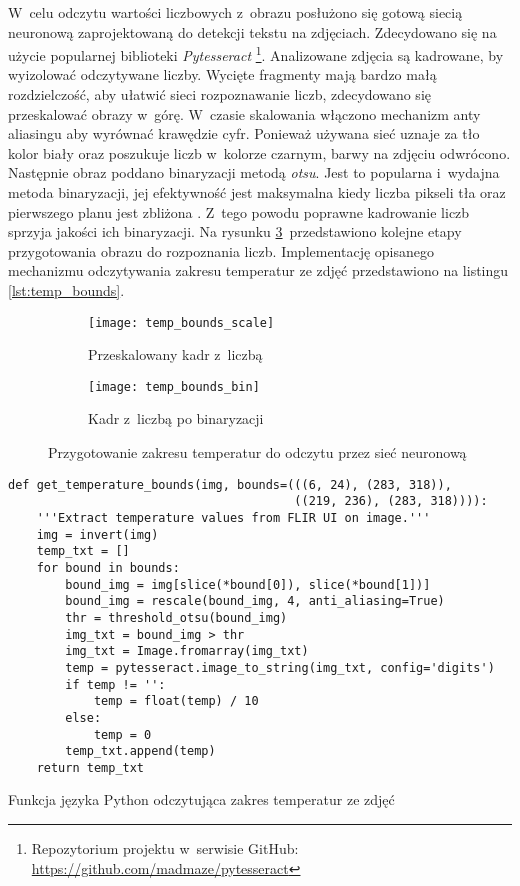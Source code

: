 W~celu odczytu wartości liczbowych z~obrazu posłużono się gotową siecią
neuronową zaprojektowaną do detekcji tekstu na zdjęciach.
Zdecydowano się na użycie popularnej biblioteki \emph{Pytesseract}%
\footnote{%
    Repozytorium projektu w~serwisie GitHub:
    \url{https://github.com/madmaze/pytesseract}
}.
Analizowane zdjęcia są kadrowane, by wyizolować odczytywane liczby.
Wycięte fragmenty mają bardzo małą rozdzielczość, aby ułatwić sieci
rozpoznawanie liczb, zdecydowano się przeskalować obrazy w~górę.
W~czasie skalowania włączono mechanizm anty aliasingu aby wyrównać krawędzie
cyfr.
Ponieważ używana sieć uznaje za tło kolor biały oraz poszukuje liczb w~kolorze
czarnym, barwy na zdjęciu odwrócono.
Następnie obraz poddano binaryzacji metodą \emph{otsu}.
Jest to popularna i~wydajna metoda binaryzacji, jej efektywność jest maksymalna
kiedy liczba pikseli tła oraz pierwszego planu jest zbliżona
\cite{sezgin_thresholding}.
Z~tego powodu poprawne kadrowanie liczb sprzyja jakości ich binaryzacji.
Na rysunku \ref{fig:temp_bounds}~przedstawiono kolejne etapy przygotowania
obrazu do rozpoznania liczb.
Implementację opisanego mechanizmu odczytywania zakresu temperatur ze zdjęć
przedstawiono na listingu \ref{lst:temp_bounds}.
\begin{figure}[htbp]
    \hspace*{\fill}
    \begin{subfigure}{0.45\textwidth}
        \centering
        \texttt{[image: temp\_bounds\_scale]}
        \caption{Przeskalowany kadr z~liczbą}
        \label{fig:temp_bounds_scale}
    \end{subfigure}
    \hfill
    \begin{subfigure}{0.45\textwidth}
        \centering
        \texttt{[image: temp\_bounds\_bin]}
        \caption{Kadr z~liczbą po binaryzacji}
        \label{fig:temp_bounds_bin}
    \end{subfigure}
    \hspace*{\fill}
    \caption{Przygotowanie zakresu temperatur do odczytu przez sieć neuronową}
    \label{fig:temp_bounds}
\end{figure}
\begin{listing}[htbp]
\begin{verbatim}
def get_temperature_bounds(img, bounds=(((6, 24), (283, 318)),
                                        ((219, 236), (283, 318)))):
    '''Extract temperature values from FLIR UI on image.'''
    img = invert(img)
    temp_txt = []
    for bound in bounds:
        bound_img = img[slice(*bound[0]), slice(*bound[1])]
        bound_img = rescale(bound_img, 4, anti_aliasing=True)
        thr = threshold_otsu(bound_img)
        img_txt = bound_img > thr
        img_txt = Image.fromarray(img_txt)
        temp = pytesseract.image_to_string(img_txt, config='digits')
        if temp != '':
            temp = float(temp) / 10
        else:
            temp = 0
        temp_txt.append(temp)
    return temp_txt
\end{verbatim}
\caption{Funkcja języka Python odczytująca zakres temperatur ze zdjęć}
\label{lst:temp_bounds}
\end{listing}

